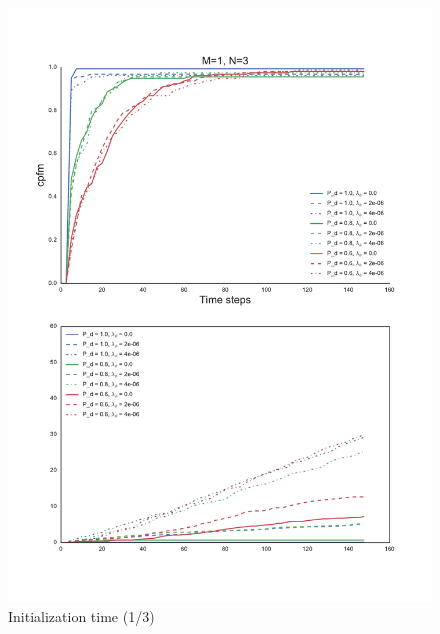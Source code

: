 {\begin{figure}
\centering
\includegraphics[height = .9\textheight]{Figures/plots/Scenario1_Init-Time(1-3).pdf}
\caption{Initialization time (1/3)}\label{fig:init_time_1-3}
\end{figure}

}
